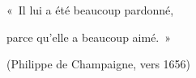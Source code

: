 «~Il lui a été beaucoup pardonné,\par
parce qu'elle a beaucoup aimé.~»\par
(Philippe de Champaigne, vers 1656)

